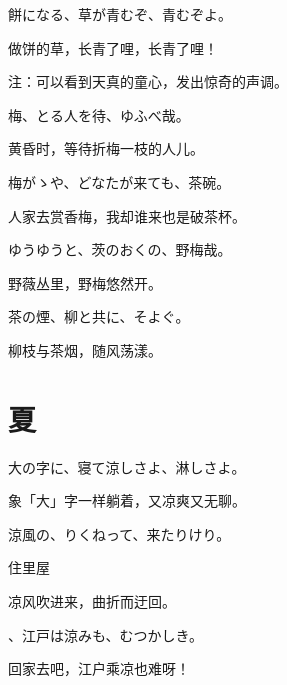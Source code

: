 \begin{haiku}
    {\FH 餅になる、草が青むぞ、青むぞよ。}

    {\FK 做饼的草，长青了哩，长青了哩！}

    {\FT 注：可以看到天真的童心，发出惊奇的声调。}
\end{haiku}

\begin{haiku}
    {\FH 梅、とる人を待、ゆふべ哉。}

    {\FK 黄昏时，等待折梅一枝的人儿。}
\end{haiku}

\begin{haiku}
    {\FH 梅がゝや、どなたが来ても、茶碗。}

    {\FK 人家去赏香梅，我却谁来也是破茶杯。}
\end{haiku}

\begin{haiku}
    {\FH ゆうゆうと、茨のおくの、野梅哉。}

    {\FK 野薇丛里，野梅悠然开。}
\end{haiku}

\begin{haiku}
    {\FH 茶の煙、柳と共に、そよぐ。}

    {\FK 柳枝与茶烟，随风荡漾。}
\end{haiku}

\section{\FK 夏}

\setcounter{haikucounter}{0}

\begin{haiku}
    {\FH 大の字に、寝て涼しさよ、淋しさよ。}

    {\FK 象「大」字一样躺着，又凉爽又无聊。}
\end{haiku}

\begin{haiku}
    {\FH 涼風の、りくねって、来たりけり。}

    {\FK 住里屋}

    {\FK 凉风吹进来，曲折而迂回。}
\end{haiku}

\begin{haiku}
    {\FH {}、江戸は涼みも、むつかしき。}

    {\FK 回家去吧，江户乘凉也难呀！}
\end{haiku}

